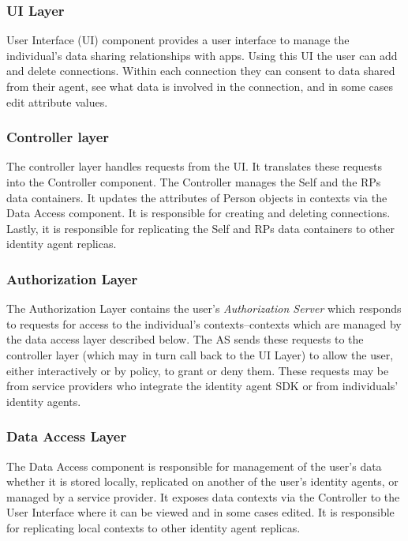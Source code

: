 \documentclass[11pt, oneside]{article}   	%
\begin{document}
\subsubsection{UI Layer}

User Interface (UI) component provides a user interface to manage the individual's data sharing relationships with apps. Using this UI the user can add and delete connections. Within each connection they can consent to data shared from their agent, see what data is involved in the connection, and in some cases edit attribute values.

\subsubsection{Controller layer}

The controller layer handles requests from the UI. It translates these requests into the Controller component. The Controller manages the Self and the RPs data containers. It updates the attributes of Person objects in contexts via the Data Access component. It is responsible for creating and deleting connections. Lastly, it is responsible for replicating the Self and RPs data containers to other identity agent replicas.

\subsubsection{Authorization Layer}

The Authorization Layer contains the user's \emph{Authorization Server} which responds to requests for access to the individual's contexts--contexts which are managed by the data access layer described below. The AS sends these requests to the controller layer (which may in turn call back to the UI Layer) to allow the user, either interactively or by policy, to grant or deny them. These requests may be from service providers who integrate the identity agent SDK or from individuals' identity agents.

\subsubsection{Data Access Layer}

The Data Access component is responsible for management of the user’s data whether it is stored locally, replicated on another of the user's identity agents, or managed by a service provider. It exposes data contexts via the Controller to the User Interface where it can be viewed and in some cases edited. It is responsible for replicating local contexts to other identity agent replicas.
\end{document}
